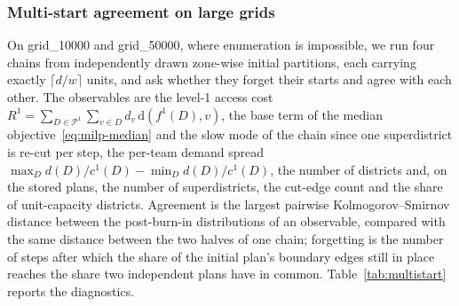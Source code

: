 \documentclass[preprint,12pt,authoryear]{elsarticle}
\theoremstyle{definition}
\newcommand{\Pc}{\mathcal{P}}          %
\begin{document}
\FloatBarrier
\subsubsection{Multi-start agreement on large grids}
\label{sec:exp-multistart}

On grid\_10000 and grid\_50000, where enumeration is impossible, we run four chains from independently drawn zone-wise initial partitions, each carrying exactly $\lceil d/w \rceil$ units, and ask whether they forget their starts and agree with each other. The observables are the level-1 access cost $R^1 = \sum_{D \in \Pc^1} \sum_{v \in D} d_v\, \mathrm{d}(f^1(D), v)$, the base term of the median objective~\eqref{eq:milp-median} and the slow mode of the chain since one superdistrict is re-cut per step, the per-team demand spread $\max_D d(D)/c^1(D) - \min_D d(D)/c^1(D)$, the number of districts and, on the stored plans, the number of superdistricts, the cut-edge count and the share of unit-capacity districts. Agreement is the largest pairwise Kolmogorov--Smirnov distance between the post-burn-in distributions of an observable, compared with the same distance between the two halves of one chain; forgetting is the number of steps after which the share of the initial plan's boundary edges still in place reaches the share two independent plans have in common. Table~\ref{tab:multistart} reports the diagnostics.
\end{document}
